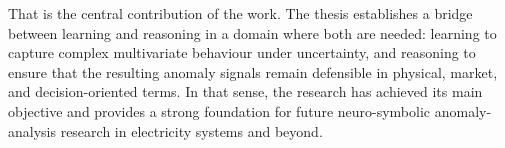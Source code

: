 That is the central contribution of the work. The thesis establishes a bridge between learning and reasoning in a domain where both are needed: learning to capture complex multivariate behaviour under uncertainty, and reasoning to ensure that the resulting anomaly signals remain defensible in physical, market, and decision-oriented terms. In that sense, the research has achieved its main objective and provides a strong foundation for future neuro-symbolic anomaly-analysis research in electricity systems and beyond.